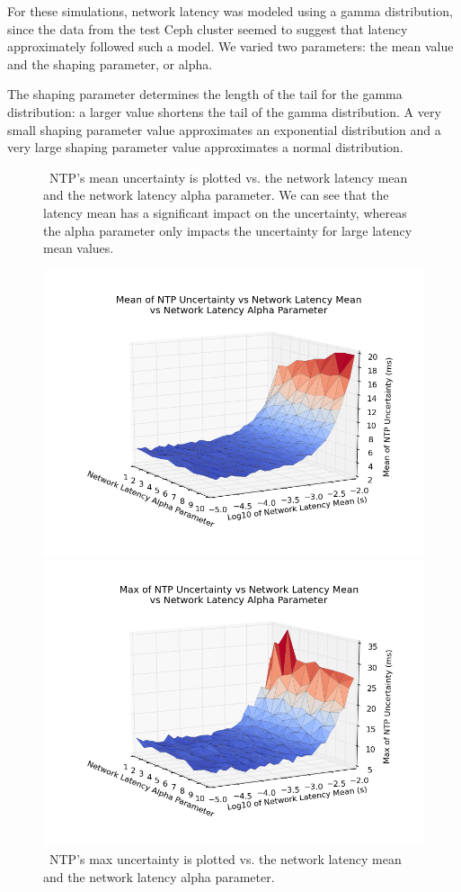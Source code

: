 For these simulations, network latency was modeled using a gamma distribution,
since the data from the test Ceph cluster seemed to suggest that
latency approximately followed such a model. We varied two parameters:
the mean value and the shaping parameter, or alpha.

The shaping parameter determines the length of the tail for the gamma distribution: 
a larger value shortens the tail of the gamma distribution. 
A very small
shaping parameter value approximates an exponential distribution and a very large
shaping parameter value approximates a normal distribution.


\begin{figure}[!htbp]
  \caption{~NTP's mean uncertainty is plotted vs. the network latency mean and the network latency alpha parameter. We can see that the latency mean has a significant impact on the uncertainty, whereas the alpha parameter only impacts the uncertainty for large latency mean values.}
  \label{fig:mean-uncertainty_latency-mean_latency-alpha}
  \includegraphics[width=0.8\linewidth]{mean_max_error-mean_latency-latency_alpha.png}

  \caption{~NTP's max uncertainty is plotted vs. the network latency mean and the network latency alpha parameter.}
  \label{fig:max-uncertainty_latency-mean_latency-alpha}
  \includegraphics[width=0.8\linewidth]{max_error-latency_mean-latency_alpha.png}
\end{figure}
